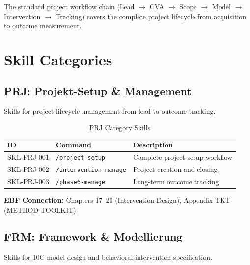 \begin{proposition}
The standard project workflow chain (Lead $\rightarrow$ CVA $\rightarrow$ Scope $\rightarrow$ Model $\rightarrow$ Intervention $\rightarrow$ Tracking)
covers the complete project lifecycle from acquisition to outcome measurement.
\end{proposition}


\section{Skill Categories}
\label{sec:sk-categories}

\subsection{PRJ: Projekt-Setup \& Management}

Skills for project lifecycle management from lead to outcome tracking.

\begin{table}[h]
\centering
\begin{tabular}{|l|l|l|}
\hline
\textbf{ID} & \textbf{Command} & \textbf{Description} \\
\hline
SKL-PRJ-001 & \texttt{/project-setup} & Complete project setup workflow \\
SKL-PRJ-002 & \texttt{/intervention-manage} & Project creation and closing \\
SKL-PRJ-003 & \texttt{/phase6-manage} & Long-term outcome tracking \\
\hline
\end{tabular}
\caption{PRJ Category Skills}
\end{table}

\textbf{EBF Connection:} Chapters 17--20 (Intervention Design), Appendix TKT (METHOD-TOOLKIT)

\subsection{FRM: Framework \& Modellierung}

Skills for 10C model design and behavioral intervention specification.

